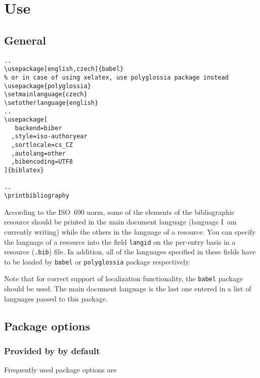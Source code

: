 \documentclass[a4paper,10pt]{ltxdockit}
\def\t|#1|{\texttt{#1}}
\newcommand*{\biblatex}{\sty{biblatex}\xspace}
\begin{document}
\section{Use}

\subsection{General}

\begin{verbatim}
..
\usepackage[english,czech]{babel}
% or in case of using xelatex, use polyglossia package instead
\usepackage{polyglossia}
\setmainlanguage{czech}
\setotherlanguage{english}
..
\usepackage[
   backend=biber
  ,style=iso-authoryear
  ,sortlocale=cs_CZ
  ,autolang=other
  ,bibencoding=UTF8
]{biblatex}

..
\printbibliography

\end{verbatim}

According to the ISO~690 norm, some of the elements of the bibliographic
resource should be printed in the main document language (language I~am
currently writing) while the others in the language of a resource. You can
specify the language of a resource into the field \t|langid| on the per-entry
basis in a resource (\t|.bib|) file. In addition, all of the languages
specified in these fields have to be loaded by \t|babel| or \t|polyglossia|
package respectively.\label{gen:multilang}

Note that for correct support of localization functionality, the \t|babel|
package should be used. The main document language is the last one entered
in a list of languages passed to this package.

\subsection{Package options}

\subsubsection{Provided by \biblatex by default}

Frequently used package options are
\end{document}
